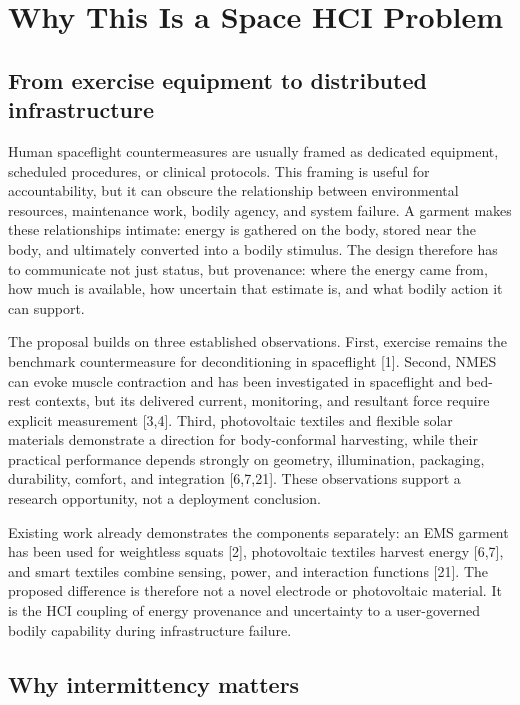 \documentclass[runningheads]{llncs}
\begin{document}
\section{Why This Is a Space HCI Problem}

\subsection{From exercise equipment to distributed infrastructure}

Human spaceflight countermeasures are usually framed as dedicated equipment, scheduled procedures, or clinical protocols. This framing is useful for accountability, but it can obscure the relationship between environmental resources, maintenance work, bodily agency, and system failure. A garment makes these relationships intimate: energy is gathered on the body, stored near the body, and ultimately converted into a bodily stimulus. The design therefore has to communicate not just status, but provenance: where the energy came from, how much is available, how uncertain that estimate is, and what bodily action it can support.

The proposal builds on three established observations. First, exercise remains the benchmark countermeasure for deconditioning in spaceflight [1]. Second, NMES can evoke muscle contraction and has been investigated in spaceflight and bed-rest contexts, but its delivered current, monitoring, and resultant force require explicit measurement [3,4]. Third, photovoltaic textiles and flexible solar materials demonstrate a direction for body-conformal harvesting, while their practical performance depends strongly on geometry, illumination, packaging, durability, comfort, and integration [6,7,21]. These observations support a research opportunity, not a deployment conclusion.

Existing work already demonstrates the components separately: an EMS garment has been used for weightless squats [2], photovoltaic textiles harvest energy [6,7], and smart textiles combine sensing, power, and interaction functions [21]. The proposed difference is therefore not a novel electrode or photovoltaic material. It is the HCI coupling of energy provenance and uncertainty to a user-governed bodily capability during infrastructure failure.

\subsection{Why intermittency matters}
\end{document}
